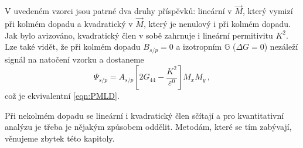 V uvedeném vzorci jsou patrné dva druhy příspěvků: lineární v $\vec{M}$, který vymizí při kolmém dopadu a kvadratický v $\vec{M}$, který je nenulový i při kolmém dopadu.
Jak bylo avizováno, kvadratický člen v sobě zahrnuje i lineární permitivitu $K^2$.
Lze také vidět, že při kolmém dopadu $B_{s/p}=0$ a izotropním $\mathbb{G}$ ($\Delta G=0$) nezáleží signál na natočení vzorku a dostaneme
\begin{equation}
    \Psi_{s/p}=A_{s/p} \left[ 2G_{44}-\frac{K^2}{\varepsilon^0}  \right] M_x M_y \,,
\end{equation}
což je ekvivalentní \eqref{eqn:PMLD}.

Při nekolmém dopadu se lineární i kvadratický člen sčítají a pro kvantitativní analýzu je třeba je nějakým způsobem oddělit.
Metodám, které se tím zabývají, věnujeme zbytek této kapitoly.
